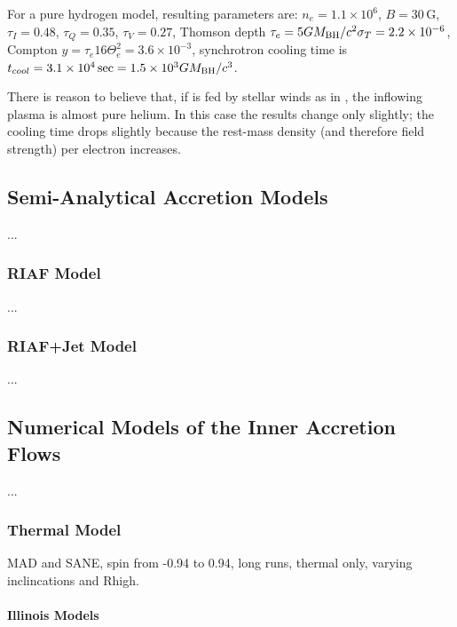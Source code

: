 \documentclass[twocolumn,twocolappendix,tighten,dvipsnames,linenumbers]{aastex63}
\begin{document}
For a pure hydrogen model, resulting parameters are: $n_e = 1.1 \times
10^6$, $B = 30\,\mathrm{G}$, $\tau_I = 0.48$, $\tau_Q = 0.35 $,
$\tau_V = 0.27$, Thomson depth $\tau_e = 5 GM_{\rm BH}/c^2 \sigma_T = 2.2
\times 10^{-6}$, Compton $y = \tau_e 16 \Theta_e^2 = 3.6 \times
10^{-3}$, synchrotron cooling time is $t_{cool} = 3.1 \times 10^4\sec
= 1.5 \times 10^3 GM_{\rm BH}/c^3$.

There is reason to believe that, if \sgra is fed by stellar winds as
in \citet{2019MNRAS.482L.123R}, the inflowing plasma is almost pure
helium.
In this case the results change only slightly; the cooling time drops
slightly because the rest-mass density (and therefore field strength)
per electron increases.

\subsection{Semi-Analytical Accretion Models}

...

\subsubsection{RIAF Model}

...

\subsubsection{RIAF+Jet Model}

...

\subsection{Numerical Models of the Inner Accretion Flows}

...

\subsubsection{Thermal Model}

MAD and SANE, spin from -0.94 to 0.94, long runs, thermal only,
varying inclincations and Rhigh.

\paragraph{Illinois Models}
\end{document}
